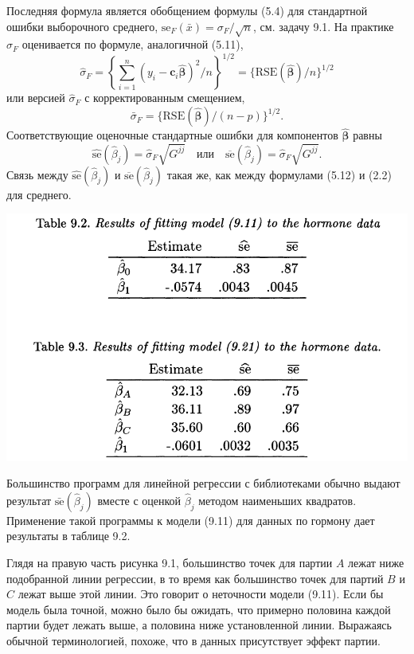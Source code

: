 Последняя формула является обобщением формулы (5.4) для стандартной ошибки выборочного среднего, $\text{se}_F(\bar{x}) = \sigma_F / \sqrt{n}$, см. задачу 9.1. На практике $\sigma_F$ оценивается по формуле, аналогичной (5.11),
\begin{equation}
	\hat{\sigma}_F = \left\{ \sum\limits_{i=1}^{n} (y_i - \textbf{c}_i \hat{\bm{\beta}})^2 / n \right\}^{1/2} = \{ \text{RSE}(\hat{\bm{\beta}})/n \}^{1/2}
\end{equation}
или версией $\hat{\sigma}_F$ с корректированным смещением,
\begin{equation}
	\bar{\sigma}_F = \{ \text{RSE}(\hat{\bm{\beta}})/(n-p) \}^{1/2}.
\end{equation}
Соответствующие оценочные стандартные ошибки для компонентов $\hat{\bm{\beta}}$ равны
\begin{equation}
	\widehat{\text{se}}(\hat{\beta}_j) = \hat{\sigma}_F \sqrt{G^{jj}} \quad \text{или} \quad \overline{\text{se}} (\hat{\beta}_j) = \hat{\sigma}_F \sqrt{G^{jj}}.
\end{equation}
Связь между $\widehat{\text{se}}(\hat{\beta}_j)$ и $\overline{\text{se}}(\hat{\beta}_j)$ такая же, как между формулами (5.12) и (2.2) для среднего.

\noindent
\includegraphics[width=\linewidth]{9/t92t93}
\newline

Большинство программ для линейной регрессии с библиотеками обычно выдают результат $\bar{\text{se}}(\hat{\beta}_j)$ вместе с оценкой $\hat{\beta}_j$ методом наименьших квадратов. Применение такой программы к модели (9.11) для данных по гормону дает результаты в таблице 9.2.

Глядя на правую часть рисунка 9.1, большинство точек для партии $A$ лежат ниже подобранной линии регрессии, в то время как большинство точек для партий $B$ и $C$ лежат выше этой линии. Это говорит о неточности модели (9.11). Если бы модель была точной, можно было бы ожидать, что примерно половина каждой партии будет лежать выше, а половина ниже установленной линии. Выражаясь обычной терминологией, похоже, что в данных присутствует эффект партии.

